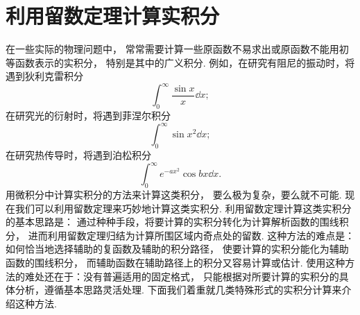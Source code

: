 \section{利用留数定理计算实积分}
在一些实际的物理问题中，
常常需要计算一些原函数不易求出或原函数不能用初等函数表示的实积分，
特别是其中的广义积分.
例如，在研究有阻尼的振动时，将遇到狄利克雷积分\begin{equation*}
	\int_0^\infty \frac{\sin x}{x} \dd{x};
\end{equation*}
在研究光的衍射时，将遇到菲涅尔积分\begin{equation*}
	\int_0^\infty \sin x^2 \dd{x};
\end{equation*}
在研究热传导时，将遇到泊松积分\begin{equation*}
	\int_0^\infty e^{-ax^2} \cos bx \dd{x}.
\end{equation*}
用微积分中计算实积分的方法来计算这类积分，
要么极为复杂，要么就不可能.
现在我们可以利用留数定理来巧妙地计算这类实积分.
利用留数定理计算这类实积分的基本思路是：
通过种种手段，将要计算的实积分转化为计算解析函数的围线积分，
进而利用留数定理归结为计算所围区域内奇点处的留数.
这种方法的难点是：如何恰当地选择辅助的复函数及辅助的积分路径，
使要计算的实积分能化为辅助函数的围线积分，
而辅助函数在辅助路径上的积分又容易计算或估计.
使用这种方法的难处还在于：没有普遍适用的固定格式，
只能根据对所要计算的实积分的具体分析，遵循基本思路灵活处理.
下面我们着重就几类特殊形式的实积分计算来介绍这种方法.


